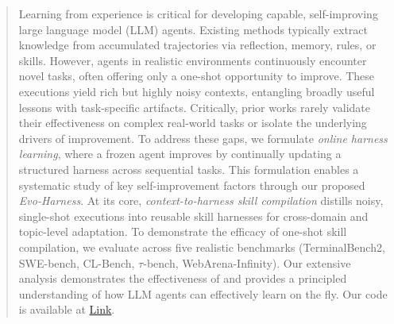 \begin{abstract}


Learning from experience is critical for developing capable, self-improving large language model (LLM) agents. Existing methods typically extract knowledge from accumulated trajectories via reflection, memory, rules, or skills. However, agents in realistic environments continuously encounter novel tasks, often offering only a one-shot opportunity to improve. These executions yield rich but highly noisy contexts, entangling broadly useful lessons with task-specific artifacts. Critically, prior works rarely validate their effectiveness on complex real-world tasks or isolate the underlying drivers of improvement. To address these gaps, we formulate \emph{online harness learning}, where a frozen agent improves by continually updating a structured harness across sequential tasks. This formulation enables a systematic study of key self-improvement factors through our proposed \emph{Evo-Harness}. At its core, \emph{context-to-harness skill compilation} distills noisy, single-shot executions into reusable skill harnesses for cross-domain and topic-level adaptation. To demonstrate the efficacy of one-shot skill compilation, we evaluate across five realistic benchmarks (TerminalBench2, SWE-bench, CL-Bench, $\tau$-bench, WebArena-Infinity). Our extensive analysis demonstrates the effectiveness of \algname{} and provides a principled understanding of how LLM agents can effectively learn on the fly. Our code is available at
\href{https://github.com/A-EVO-Lab/a-evolve/tree/release/evo-harness}{Link}.



\end{abstract}
